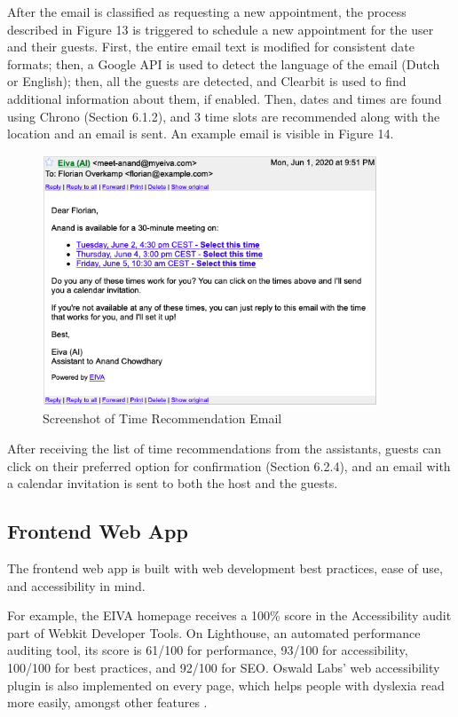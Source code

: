 \documentclass{article}
\begin{document}
After the email is classified as requesting a new appointment, the process described in Figure 13 is triggered to schedule a new appointment for the user and their guests. First, the entire email text is modified for consistent date formats; then, a Google API is used to detect the language of the email (Dutch or English); then, all the guests are detected, and Clearbit is used to find additional information about them, if enabled. Then, dates and times are found using Chrono (Section 6.1.2), and 3 time slots are recommended along with the location and an email is sent. An example email is visible in Figure 14.

\begin{figure}[h]
	\center
	\includegraphics[width=10cm]{screenshot-dates.png}
	\caption{Screenshot of Time Recommendation Email}
\end{figure}

After receiving the list of time recommendations from the assistants, guests can click on their preferred option for confirmation (Section 6.2.4), and an email with a calendar invitation is sent to both the host and the guests.

\subsection{Frontend Web App}

The frontend web app is built with web development best practices, ease of use, and accessibility in mind.

For example, the EIVA homepage receives a 100\% score in the Accessibility audit part of Webkit Developer Tools. On Lighthouse, an automated performance auditing tool, its score is 61/100 for performance, 93/100 for accessibility, 100/100 for best practices, and 92/100 for SEO. Oswald Labs' web accessibility plugin is also implemented on every page, which helps people with dyslexia read more easily, amongst other features \cite{gupta_improving_2019}.
\end{document}
